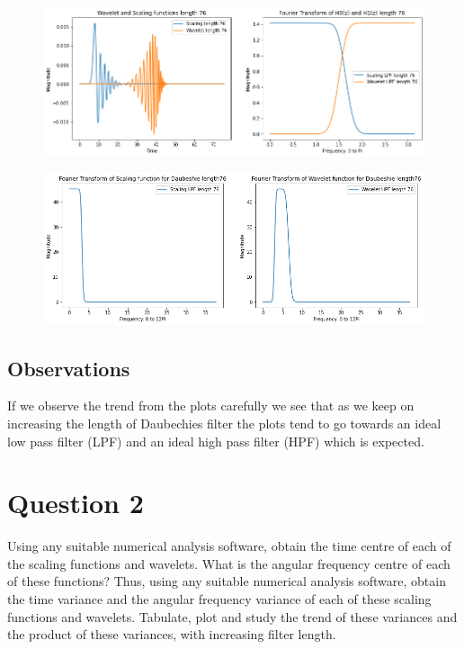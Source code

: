 \documentclass{article}
\begin{document}
\begin{figure}[H]
\begin{center}
\includegraphics[scale = 0.5]{76.png}
\end{center}
\end{figure}

\begin{figure}[H]
\begin{center}
\includegraphics[scale = 0.5]{76f.png}
\end{center}
\end{figure}
\subsection{Observations}

If we observe the trend from the plots carefully we see that as we keep on increasing the length of Daubechies filter the plots tend to go towards an ideal low pass filter (LPF) and an ideal high pass filter (HPF) which is expected.

\section{Question 2}
Using any suitable numerical analysis software, obtain the time centre of each of the scaling functions and wavelets. What is the angular frequency centre of each of these functions? Thus, using any suitable numerical analysis software, obtain the time variance and the angular frequency variance of each of these scaling functions and wavelets. Tabulate, plot and study the trend of these variances and the product of these variances, with increasing filter length.
\end{document}
